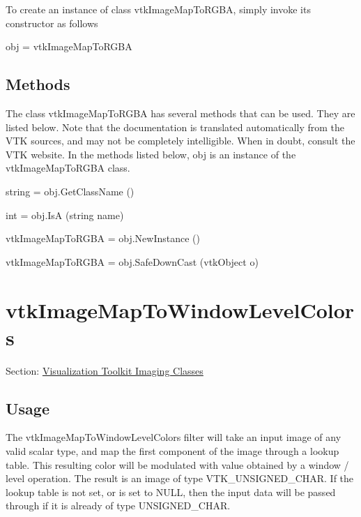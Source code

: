 To create an instance of class vtk\-Image\-Map\-To\-R\-G\-B\-A, simply invoke its constructor as follows \begin{DoxyVerb}  obj = vtkImageMapToRGBA
\end{DoxyVerb}
 \hypertarget{vtkwidgets_vtkxyplotwidget_Methods}{}\subsection{Methods}\label{vtkwidgets_vtkxyplotwidget_Methods}
The class vtk\-Image\-Map\-To\-R\-G\-B\-A has several methods that can be used. They are listed below. Note that the documentation is translated automatically from the V\-T\-K sources, and may not be completely intelligible. When in doubt, consult the V\-T\-K website. In the methods listed below, {\ttfamily obj} is an instance of the vtk\-Image\-Map\-To\-R\-G\-B\-A class. 
\begin{DoxyItemize}
\item {\ttfamily string = obj.\-Get\-Class\-Name ()}  
\item {\ttfamily int = obj.\-Is\-A (string name)}  
\item {\ttfamily vtk\-Image\-Map\-To\-R\-G\-B\-A = obj.\-New\-Instance ()}  
\item {\ttfamily vtk\-Image\-Map\-To\-R\-G\-B\-A = obj.\-Safe\-Down\-Cast (vtk\-Object o)}  
\end{DoxyItemize}\hypertarget{vtkimaging_vtkimagemaptowindowlevelcolors}{}\section{vtk\-Image\-Map\-To\-Window\-Level\-Colors}\label{vtkimaging_vtkimagemaptowindowlevelcolors}
Section\-: \hyperlink{sec_vtkimaging}{Visualization Toolkit Imaging Classes} \hypertarget{vtkwidgets_vtkxyplotwidget_Usage}{}\subsection{Usage}\label{vtkwidgets_vtkxyplotwidget_Usage}
The vtk\-Image\-Map\-To\-Window\-Level\-Colors filter will take an input image of any valid scalar type, and map the first component of the image through a lookup table. This resulting color will be modulated with value obtained by a window / level operation. The result is an image of type V\-T\-K\-\_\-\-U\-N\-S\-I\-G\-N\-E\-D\-\_\-\-C\-H\-A\-R. If the lookup table is not set, or is set to N\-U\-L\-L, then the input data will be passed through if it is already of type U\-N\-S\-I\-G\-N\-E\-D\-\_\-\-C\-H\-A\-R.


